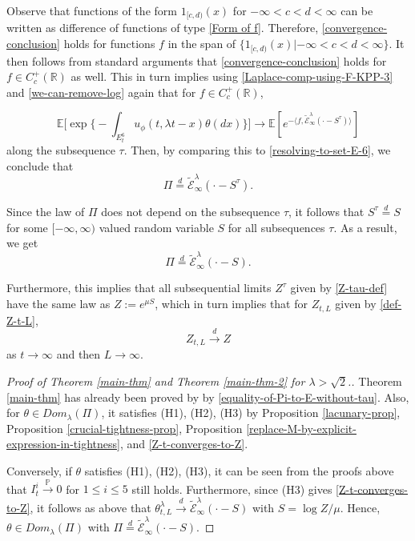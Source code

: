 \documentclass[a4paper,reqno]{amsart}%
\newcommand{\1}{\mathbf 1}
\theoremstyle{mine}
\numberwithin{theorem}{section}
\numberwithin{equation}{section}
\theoremstyle{remark}
\begin{document}
Observe that functions of the form $1_{[c, d)}(x)$ for $-\infty< c<d <\infty$ can be written as difference of functions of type \eqref{Form of f}. Therefore, \eqref{convergence-conclusion} holds for functions $f$ in the span of $\{1_{[c, d)}(x) | -\infty< c<d <\infty\}$. It then follows from standard arguments that \eqref{convergence-conclusion} holds for $f\in C_c^+(\mathbb{R})$ as well. This in turn implies using \eqref{Laplace-comp-using-F-KPP-3} and \eqref{we-can-remove-log} again that for $f\in C_c^+(\mathbb{R})$,  


\begin{equation}\label{convergence-of-Laplace-to-the-limit-we-want}
\mathbb{E}\biggl[\exp\biggl\{-\int_{E_t^6} u_\phi(t, \lambda t -x)\theta(dx)\biggr\}\biggr] \to \mathbb{E}[e^{-\langle f, \widetilde{\mathcal E}_\infty^\lambda(\cdot -S^\tau)\rangle}]
\end{equation}
along the subsequence $\tau$. Then, by comparing this to \eqref{resolving-to-set-E-6}, we conclude that 
\begin{equation}\label{equality-of-Pi-to-E}
    \Pi \overset{d}{=} \widetilde{\mathcal E}_\infty^\lambda(\cdot -S^\tau).
\end{equation}

Since the law of $\Pi$ does not depend on the subsequence $\tau$, it follows that $S^{\tau} \overset{d}{=} S$ for some $[-\infty, \infty)$ valued random variable $S$ for all subsequences $\tau$. As a result, we get
\begin{equation}\label{equality-of-Pi-to-E-without-tau}
    \Pi \overset{d}{=} \widetilde{\mathcal E}_\infty^\lambda(\cdot -S).
\end{equation}

Furthermore, this implies that all subsequential limits $Z^\tau$ given by \eqref{Z-tau-def} have the same law as $Z:= e^{\mu S}$, which in turn implies that for $Z_{t,L}$ given by \eqref{def-Z-t-L}, 
\begin{equation}\label{Z-t-converges-to-Z}
    Z_{t, L} \overset{d}{\to} Z
\end{equation}
as $t\to \infty$ and then $L\to \infty$. 


\begin{proof}[Proof of Theorem \ref{main-thm} and Theorem \ref{main-thm-2} for $\lambda >\sqrt{2}$.]
    Theorem \ref{main-thm} has already been proved by by \eqref{equality-of-Pi-to-E-without-tau}. Also, for $\theta \in Dom_{\lambda}(\Pi)$, it satisfies (H1), (H2), (H3) by Proposition \ref{lacunary-prop}, Proposition \ref{crucial-tightness-prop}, Proposition \ref{replace-M-by-explicit-expression-in-tightness}, and \eqref{Z-t-converges-to-Z}. 
    
    Conversely, if $\theta$ satisfies (H1), (H2), (H3), it can be seen from the proofs above that $I_t^i \overset{\mathbb{P}}{\to} 0$ for $1\leq i\leq 5$ still holds. Furthermore, since (H3) gives \eqref{Z-t-converges-to-Z}, it follows as above that $\theta_{t,L}^\lambda \overset{d}{\to} \widetilde{\mathcal E}_\infty^\lambda(\cdot -S)$ with $S= \log Z /\mu$. Hence, $\theta \in Dom_{\lambda}(\Pi)$ with $\Pi \overset{d}{=} \widetilde{\mathcal E}_\infty^\lambda(\cdot -S)$.
\end{proof}
\end{document}
